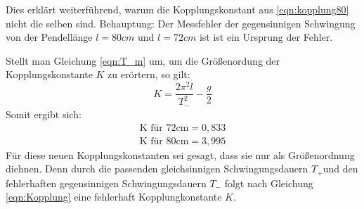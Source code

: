 Dies erklärt weiterführend, warum die Kopplungskonstant aus \ref{eqn:kopplung80} nicht die selben
sind.
Behauptung: Der Messfehler der gegensinnigen Schwingung von der Pendellänge $l=80cm$ und $l=72cm$ ist 
ist ein Ursprung der Fehler.

Stellt man Gleichung \ref{eqn:T_m} um, um die Größenordung der Kopplungskonstante $K$ zu erörtern, so gilt:
\begin{equation}
    K=\frac{2\pi^2l}{T_{-}^2}-\frac{g}{2}
\end{equation}
Somit ergibt sich:
\begin{align*}
    \textrm{K für 72cm} = 0,833\\
    \textrm{K für 80cm} = 3,995 
\end{align*}
Für diese neuen Kopplungskonstanten sei gesagt, dass sie nur als Größenordnung diehnen.
Denn durch die passenden gleichsinnigen Schwingungsdauern $T_+$und den fehlerhaften gegensinnigen Schwingungsdauern $T_-$
folgt nach Gleichung \ref{eqn:Kopplung} eine fehlerhaft Kopplungkonstante $K$.
 
